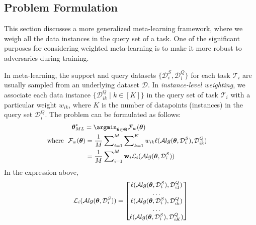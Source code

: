 \subsection{Problem Formulation}
This section discusses a more generalized meta-learning framework, where we weigh all the data instances in the query set of a task. One of the significant purposes for considering weighted meta-learning is to make it more robust to adversaries during training.

In meta-learning, the support and query datasets $\{\mathcal{D}_{i}^{S}, \mathcal{D}_{i}^{Q}\}$ for each task $\mathcal{T}_{i}$ are usually sampled from an underlying dataset $\mathcal{D}$. In \textit{instance-level weighting}, we associate each data instance $\{\mathcal{D}_{ik}^{Q} \mid k\in [K]\}$ in the query set of task $\mathcal{T}_{i}$ with a particular weight $w_{ik}$, where $K$ is the number of datapoints (instances) in the query set $\mathcal{D}_{i}^{Q}$. 
The problem can be formulated as follows:
\begin{equation}
\small
    \begin{aligned}
    \label{instance-weighting}
         \boldsymbol{\theta}^*_{ML}= \argmin_{\boldsymbol{\theta} \in \boldsymbol{\Theta}} {\mathcal{F}_w(\boldsymbol{\theta})}\text{\hspace{-3cm}}\\
         \text{where\hspace{2mm}}\mathcal{F}_w(\boldsymbol{\theta}) &= \frac{1}{M}\sum\nolimits_{i=1}^{M} \sum\nolimits_{k=1}^{K}w_{ik}\ell(\mathcal{A}lg(\boldsymbol{\theta}, \mathcal{D}_{i}^{S}), \mathcal{D}_{ik}^{Q}) \\
         &=\frac{1}{M}\sum\nolimits_{i=1}^{M} \mathbf{w}_{i}\mathcal{L}_{i}(\mathcal{A}lg(\boldsymbol{\theta}, \mathcal{D}_{i}^{S})) 
    \end{aligned}
\end{equation}
In the expression above, 
$$
\small
\mathcal{L}_{i}(\mathcal{A}lg(\boldsymbol{\theta},\mathcal{D}_i^{S})) = \begin{bmatrix} \ell(\mathcal{A}lg(\boldsymbol{\theta},\mathcal{D}_i^{S}), \mathcal{D}_{i1}^{Q}) \\ \dots \\ \ell(\mathcal{A}lg(\boldsymbol{\theta},\mathcal{D}_i^{S}), \mathcal{D}_{ik}^{Q}) \\ \dots \\ \ell(\mathcal{A}lg(\boldsymbol{\theta},\mathcal{D}_i^{S}), \mathcal{D}_{iK}^{Q}) \end{bmatrix}
$$
